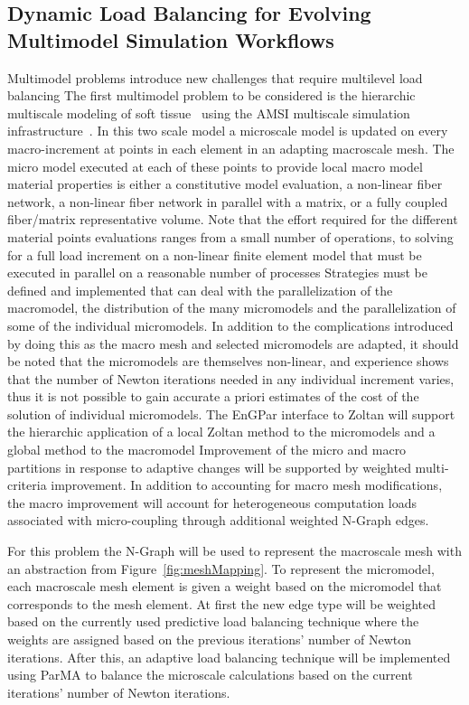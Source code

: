 \documentclass[12pt]{article}
\begin{document}
\subsection{Dynamic Load Balancing for Evolving Multimodel Simulation Workflows}
Multimodel problems introduce new challenges that require multilevel load
balancing The first multimodel problem to be considered is the hierarchic
multiscale modeling of soft tissue~\cite{luo07} using the AMSI multiscale
simulation infrastructure~\cite{del09}.
In this two scale model a microscale model is updated on every macro-increment
at points in each element in an adapting macroscale mesh.
The micro model executed at each of these points to provide local macro model
material properties is either a constitutive model evaluation, a non-linear
fiber network, a non-linear fiber network in parallel with a matrix, or a fully
coupled fiber/matrix representative volume.
Note that the effort required for the different material points evaluations
ranges from a small number of operations, to solving for a full load increment
on a non-linear finite element model that must be executed in parallel on a
reasonable number of processes Strategies must be defined and implemented that
can deal with the parallelization of the macromodel, the distribution of the
many micromodels and the parallelization of some of the individual micromodels.
In addition to the complications introduced by doing this as the macro mesh
and selected micromodels are adapted, it should be noted that the micromodels
are themselves non-linear, and experience shows that the number of Newton
iterations needed in any individual increment varies, thus it is not possible
to gain accurate a priori estimates of the cost of the solution of individual
micromodels.
The EnGPar interface to Zoltan will support the hierarchic application of a
local Zoltan method to the micromodels and a global method to the macromodel
Improvement of the micro and macro partitions in response to adaptive changes
will be supported by weighted multi-criteria improvement.
In addition to accounting for macro mesh modifications, the macro improvement
will account for heterogeneous computation loads associated with micro-coupling
through additional weighted N-Graph edges.

For this problem the N-Graph will be used to represent the macroscale mesh with 
an abstraction from Figure~\ref{fig:meshMapping}. To represent the micromodel,
each macroscale mesh element is given a weight based on the micromodel that
corresponds to the mesh element. At first the new edge type will be weighted 
based on the currently used predictive load balancing technique where the 
weights are assigned based on the previous iterations' number of Newton 
iterations. %
After this, an adaptive load balancing technique will be implemented using ParMA 
to balance the microscale calculations based on the current iterations' number
of Newton iterations.%
\end{document}
